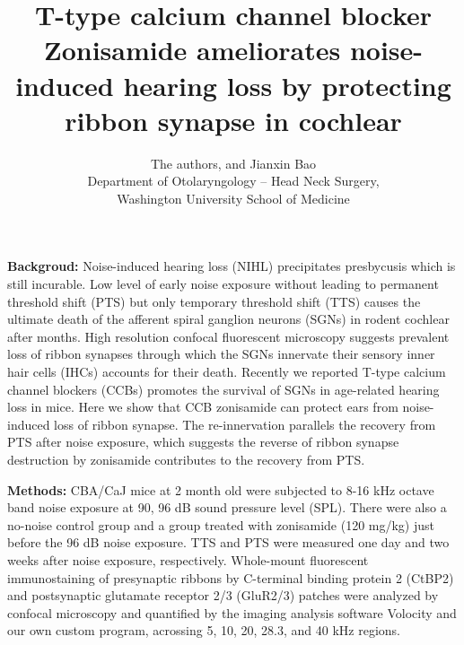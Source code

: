 \documentclass[11pt]{article}
\begin{document}




\title{T-type calcium channel blocker Zonisamide ameliorates noise-induced hearing loss by protecting ribbon synapse in cochlear}
\author{The authors, and Jianxin Bao \\ Department of Otolaryngology -- Head Neck Surgery,\\ Washington University School of Medicine}
\maketitle
{\bf Backgroud:} Noise-induced hearing loss (NIHL) precipitates presbycusis which is still incurable. Low level of early noise exposure without leading to permanent threshold shift (PTS) but only temporary threshold shift (TTS)  causes the ultimate death of the afferent spiral ganglion neurons (SGNs) in rodent cochlear after months. High resolution confocal fluorescent microscopy suggests prevalent loss of ribbon synapses through which the SGNs innervate their sensory inner hair cells (IHCs) accounts for their death. Recently we reported T-type calcium channel blockers (CCBs) promotes the survival of SGNs in age-related hearing loss in mice. Here we show that CCB zonisamide can protect ears from noise-induced loss of ribbon synapse. The re-innervation parallels the recovery from PTS after noise exposure, which suggests the reverse of ribbon synapse destruction by zonisamide contributes to the recovery from PTS.

{\bf Methods:} CBA/CaJ mice at 2 month old were subjected to 8-16 kHz octave band noise exposure at 90, 96 dB sound pressure level (SPL). There were also a no-noise control group and a group treated with zonisamide (120 mg/kg) just before the 96 dB noise exposure. TTS and PTS were measured one day and two weeks after noise exposure, respectively. Whole-mount fluorescent immunostaining of presynaptic ribbons by C-terminal binding protein 2 (CtBP2) and postsynaptic glutamate receptor 2/3 (GluR2/3) patches were analyzed by confocal microscopy and quantified by the imaging analysis software Volocity and our own custom program, acrossing 5, 10, 20, 28.3, and 40 kHz regions.
\end{document}
